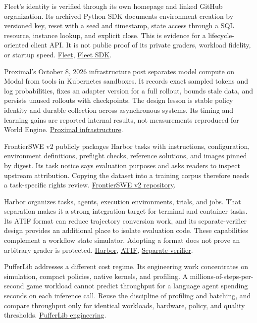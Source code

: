 \documentclass[
  11pt,
  letterpaper,
]{article}
\begin{document}
Fleet's identity is verified through its own homepage and linked GitHub
organization. Its archived Python SDK documents environment creation by
versioned key, reset with a seed and timestamp, state access through a
SQL resource, instance lookup, and explicit close. This is evidence for
a lifecycle-oriented client API. It is not public proof of its private
graders, workload fidelity, or startup speed.
\href{https://fleetai.com/}{Fleet},
\href{https://github.com/fleet-ai/fleet-sdk}{Fleet SDK}.

Proximal's October 8, 2026 infrastructure post separates model compute
on Modal from tools in Kubernetes sandboxes. It records exact sampled
tokens and log probabilities, fixes an adapter version for a full
rollout, bounds stale data, and persists unused rollouts with
checkpoints. The design lesson is stable policy identity and durable
collection across asynchronous systems. Its timing and learning gains
are reported internal results, not measurements reproduced for World
Engine. \href{https://www.proximal.so/blog/posttraining-infra/}{Proximal
infrastructure}.

FrontierSWE v2 publicly packages Harbor tasks with instructions,
configuration, environment definitions, preflight checks, reference
solutions, and images pinned by digest. Its task notice says evaluation
purposes and asks readers to inspect upstream attribution. Copying the
dataset into a training corpus therefore needs a task-specific rights
review.
\href{https://github.com/Proximal-Labs/frontier-swe-v2}{FrontierSWE v2
repository}.

Harbor organizes tasks, agents, execution environments, trials, and
jobs. That separation makes it a strong integration target for terminal
and container tasks. Its ATIF format can reduce trajectory conversion
work, and its separate-verifier design provides an additional place to
isolate evaluation code. These capabilities complement a workflow state
simulator. Adopting a format does not prove an arbitrary grader is
protected. \href{https://github.com/harbor-framework/harbor}{Harbor},
\href{https://docs.harborframework.com/agents/atif}{ATIF},
\href{https://docs.harborframework.com/tasks/separate-verifier}{Separate
verifier}.

PufferLib addresses a different cost regime. Its engineering work
concentrates on simulation, compact policies, native kernels, and
profiling. A millions-of-steps-per-second game workload cannot predict
throughput for a language agent spending seconds on each inference call.
Reuse the discipline of profiling and batching, and compare throughput
only for identical workloads, hardware, policy, and quality thresholds.
\href{https://puffer.ai/blog/engineering-4.0/}{PufferLib engineering}.
\end{document}

